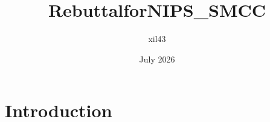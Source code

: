 \documentclass{article}
\title{RebuttalforNIPS_SMCC}
\author{xil43 }
\date{July 2026}
\begin{document}
\maketitle

\section{Introduction}
\end{document}
